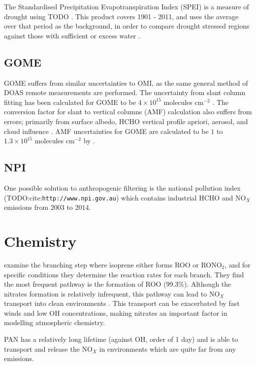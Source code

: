     The Standardised Precipitation Evapotranspiration Index (SPEI) is a measure of drought using TODO \textcite{SPEI_website}.
    This product covers 1901 - 2011, and uses the average over that period as the background, in order to compare drought stressed regions against those with sufficient or excess water \textcite{SPEI_website}.
    
  \subsection{GOME}
    
    GOME suffers from similar uncertainties to OMI, as the same general method of DOAS remote measurements are performed.
    The uncertainty from slant column fitting has been calculated for GOME to be $4\times10^{15}$ molecules cm$^{-2}$ \parencite{Chance2000, Millet2006}. 
    The conversion factor for slant to vertical columns (AMF) calculation also suffers from errors; primarily from surface albedo, HCHO vertical profile apriori, aerosol, and cloud influence \parencite{Millet2006}. 
    AMF uncertainties for GOME are calculated to be $1$ to $1.3\times10^{15}$ molecules cm$^{-2}$ by \textcite{Shim2005}.

  \subsection{NPI}
  
  One possible solution to anthropogenic filtering is the national pollution index (TODO:cite:\verb|http://www.npi.gov.au|) which contains industrial HCHO and NO$_X$ emissions from 2003 to 2014.
\section{Chemistry}
  
  \textcite{Patchen2007} examine the branching step where isoprene either forms ROO or RONO$_2$, and for specific conditions they determine the reaction rates for each branch.
  They find the most frequent pathway is the formation of ROO (99.3\%).
  Although the nitrates formation is relatively infrequent, this pathway can lead to NO$_X$ transport into clean environments \parencite{Horowitz1998}.
  This transport can be exacerbated by fast winds and low OH concentrations, making nitrates an important factor in modelling atmospheric chemistry.
  
  PAN has a relatively long lifetime (against OH, order of 1 day) and is able to transport and release the NO$_X$ in environments which are quite far from any emissions.
  
